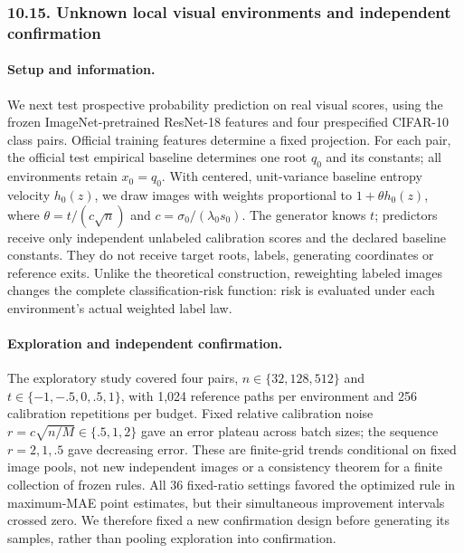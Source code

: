 \subsubsection{10.15. Unknown local visual environments and independent confirmation}\label{experiments-visual-confirmation}

\paragraph{Setup and information.} We next test prospective probability prediction on real visual scores, using the frozen ImageNet-pretrained ResNet-18 features and four prespecified CIFAR-10 class pairs. Official training features determine a fixed projection. For each pair, the official test empirical baseline determines one root $q_0$ and its constants; all environments retain $x_0=q_0$. With centered, unit-variance baseline entropy velocity $h_0(z)$, we draw images with weights proportional to $1+\theta h_0(z)$, where $\theta=t/(c\sqrt n)$ and $c=\sigma_0/(\lambda_0s_0)$. The generator knows $t$; predictors receive only independent unlabeled calibration scores and the declared baseline constants. They do not receive target roots, labels, generating coordinates or reference exits. Unlike the theoretical construction, reweighting labeled images changes the complete classification-risk function: risk is evaluated under each environment's actual weighted label law.

\paragraph{Exploration and independent confirmation.} The exploratory study covered four pairs, $n\in\{32,128,512\}$ and $t\in\{-1,-.5,0,.5,1\}$, with 1,024 reference paths per environment and 256 calibration repetitions per budget. Fixed relative calibration noise $r=c\sqrt{n/M}\in\{.5,1,2\}$ gave an error plateau across batch sizes; the sequence $r=2,1,.5$ gave decreasing error. These are finite-grid trends conditional on fixed image pools, not new independent images or a consistency theorem for a finite collection of frozen rules. All 36 fixed-ratio settings favored the optimized rule in maximum-MAE point estimates, but their simultaneous improvement intervals crossed zero. We therefore fixed a new confirmation design before generating its samples, rather than pooling exploration into confirmation.


